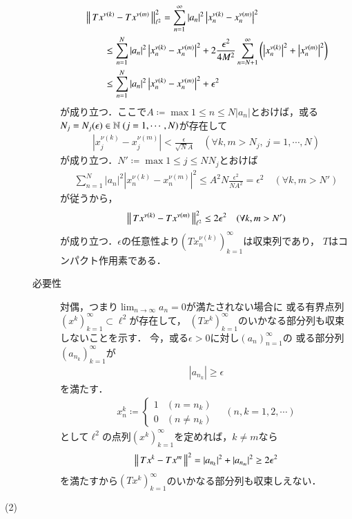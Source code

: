 \begin{prf}
\begin{description}
\begin{description}
\begin{align}
							&\left\|\, T x^{\nu(k)} - T x^{\nu(m)}\, \right\|_{\ell^2}^2
							= \sum_{n=1}^{\infty} |a_n|^2 \left|x_n^{\nu(k)} - x_n^{\nu(m)} \right|^2 \\
							&\qquad \leq \sum_{n=1}^{N} |a_n|^2 \left|x_n^{\nu(k)} - x_n^{\nu(m)} \right|^2 
								+ 2 \frac{\epsilon^2}{4 M^2} \sum_{n = N+1}^{\infty} \left( \left|x_n^{\nu(k)} \right|^2 + \left|x_n^{\nu(m)} \right|^2 \right) \\
							&\qquad \leq \sum_{n=1}^{N} |a_n|^2 \left|x_n^{\nu(k)} - x_n^{\nu(m)} \right|^2 + \epsilon^2
						\end{align}
						が成り立つ．ここで$A \coloneqq \max{1 \leq n \leq N}{|a_n|}$とおけば，或る$N_j = N_j(\epsilon) \in \N\ (j=1,\cdots,N)$が存在して
						\begin{align}
							\left|x_j^{\nu(k)} - x_j^{\nu(m)} \right| < \frac{\epsilon}{\sqrt{N} A}
							\quad (\forall k,m > N_j,\ j=1,\cdots,N)
						\end{align}
						が成り立つ．$N' \coloneqq \max{1 \leq j \leq N}{N_j}$とおけば
						\begin{align}
							\sum_{n=1}^{N} |a_n|^2 \left|x_n^{\nu(k)} - x_n^{\nu(m)} \right|^2
							\leq A^2 N \frac{\epsilon^2}{N A^2} = \epsilon^2
							\quad (\forall k,m > N')
						\end{align}
						が従うから，
						\begin{align}
							\left\|\, T x^{\nu(k)} - T x^{\nu(m)}\, \right\|_{\ell^2}^2 \leq 2 \epsilon^2 \quad (\forall k,m > N')
						\end{align}
						が成り立つ．$\epsilon$の任意性より$\left(T x_n^{\nu(k)} \right)_{k=1}^{\infty}$は収束列であり，
						$T$はコンパクト作用素である．
						
					\item[必要性]
						対偶，つまり$\lim_{n \to \infty} a_n = 0$が満たされない場合に
						或る有界点列$(x^k)_{k=1}^{\infty} \subset \ell^2$が存在して，
						$(T x^k)_{k=1}^{\infty}$のいかなる部分列も収束しないことを示す．
						今，或る$\epsilon > 0$に対し$(a_n)_{n=1}^{\infty}$の
						或る部分列$\left(a_{n_k}\right)_{k=1}^{\infty}$が
						\begin{align}
							\left| a_{n_k} \right| \geq \epsilon
						\end{align}
						を満たす．
						\begin{align}
							x^k_n \coloneqq
							\begin{cases}
								1 & (n=n_k) \\
								0 & (n \neq n_k)
							\end{cases}
							\quad (n,k=1,2,\cdots)
						\end{align}
						として$\ell^2$の点列$(x^k)_{k=1}^{\infty}$を定めれば，$k \neq m$なら
						\begin{align}
							\left\|\, T x^k - T x^m\, \right\|_{}^2
							= |a_{n_k}|^2 + |a_{n_m}|^2
							\geq 2 \epsilon^2
						\end{align}
						を満たすから$(T x^k)_{k=1}^{\infty}$のいかなる部分列も収束しえない．
				\end{description}
			\item[(2)]
		\end{description}
	\end{prf}
	
